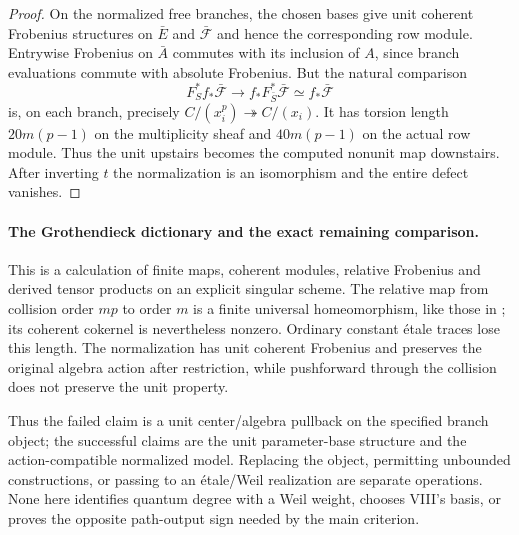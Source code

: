 \begin{proof}
On the normalized free branches, the chosen bases give unit
coherent Frobenius structures on $\bar E$ and
$\bar{\mathcal F}$ and hence the corresponding row module.
Entrywise Frobenius on $\bar A$ commutes with its inclusion of
$A$, since branch evaluations commute with absolute Frobenius.
But the natural comparison
\[
 F_S^*f_*\bar{\mathcal F}
       \longrightarrow f_*F_{\bar S}^*\bar{\mathcal F}
       \simeq f_*\bar{\mathcal F}
\]
is, on each branch, precisely $C/(x_i^p)\twoheadrightarrow C/(x_i)$.
It has torsion length $20m(p-1)$ on the multiplicity sheaf and
$40m(p-1)$ on the actual row module. Thus the unit upstairs
becomes the computed nonunit map downstairs. After inverting $t$
the normalization is an isomorphism and the entire defect vanishes.
\end{proof}

\paragraph{The Grothendieck dictionary and the exact remaining comparison.}
This is a calculation of finite maps, coherent modules, relative
Frobenius and derived tensor products on an explicit singular scheme.
The relative map from collision order $mp$ to order $m$ is a finite
universal homeomorphism, like those in ; its coherent cokernel
is nevertheless nonzero. Ordinary constant \'etale traces lose this
length. The normalization has unit coherent Frobenius and preserves
the original algebra action after restriction, while pushforward
through the collision does not preserve the unit property.

Thus the failed claim is a unit center/algebra pullback on the
specified branch object; the successful claims are the unit
parameter-base structure and the action-compatible normalized model.
Replacing the object, permitting unbounded constructions, or passing
to an \'etale/Weil realization are separate operations. None here
identifies quantum degree with a Weil weight, chooses VIII's basis,
or proves the opposite path-output sign needed by the main criterion.
